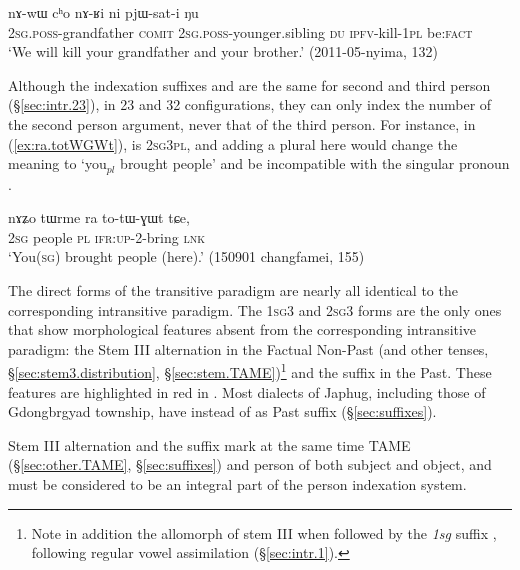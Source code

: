 \begin{exe}
\ex   \label{ex:ni.pjWsati}
\gll   nɤ-wɯ cʰo nɤ-ʁi ni pjɯ-sat-i ŋu \\
\textsc{2sg}.\textsc{poss}-grandfather \textsc{comit} \textsc{2sg}.\textsc{poss}-younger.sibling \textsc{du} \textsc{ipfv}-kill-\textsc{1pl} be:\textsc{fact} \\
\glt `We will kill your grandfather and your brother.' (2011-05-nyima, 132)
\end{exe}

Although the indexation suffixes  and  are the same for second and third person (§\ref{sec:intr.23}), in 2\fl{}3 and 3\fl{}2 configurations, they can only index the number of the second person argument, never that of the third person. For instance, in (\ref{ex:ra.totWGWt}),  is \textsc{2sg}\fl{}\textsc{3pl}, and adding a plural  here would change the meaning to `you$_{pl}$ brought people' and be incompatible with the singular pronoun .

\begin{exe}
\ex   \label{ex:ra.totWGWt}
\gll    nɤʑo tɯrme ra to-tɯ-ɣɯt tɕe, \\
\textsc{2sg} people \textsc{pl} \textsc{ifr}:\textsc{up}-2-bring \textsc{lnk} \\
\glt `You(\textsc{sg}) brought people (here).' (150901 changfamei, 155)
\end{exe}

The direct forms of the transitive paradigm are nearly all identical to the corresponding intransitive paradigm. The \textsc{1sg}\fl{}3 and \textsc{2sg}{}\fl{}3 forms are the only ones that show morphological features absent from the corresponding intransitive paradigm: the Stem III alternation in the Factual Non-Past (and other tenses, §\ref{sec:stem3.distribution}, §\ref{sec:stem.TAME})\footnote{Note in addition the allomorph  of stem III when followed by the \textit{1sg} suffix , following regular vowel assimilation (§\ref{sec:intr.1}). 
} and the  suffix in the Past. These features are highlighted in red in . Most dialects of Japhug, including those of Gdongbrgyad township, have  instead of  as Past suffix (§\ref{sec:suffixes}).

Stem III alternation and the  suffix mark at the same time TAME (§\ref{sec:other.TAME}, §\ref{sec:suffixes}) and person of both subject and object, and must be considered to be an integral part of the person indexation system.


